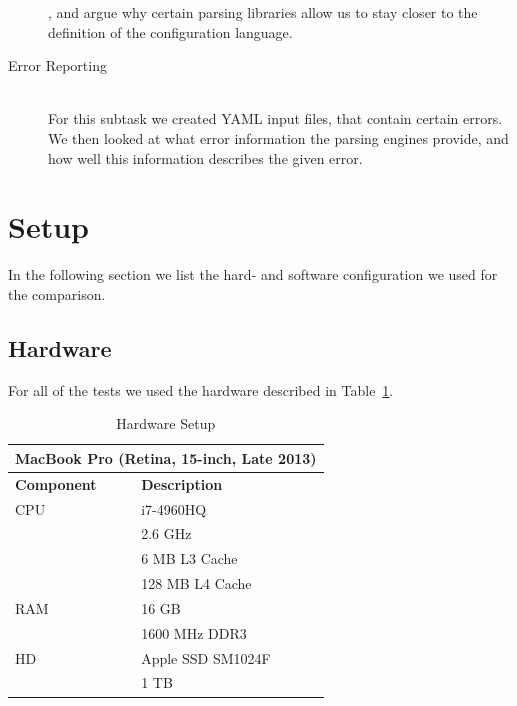 \begin{description}
  \closeness*

  , and argue why certain parsing libraries allow us to stay closer to the definition of the configuration language.

  \item[Error Reporting]~\\[0.1cm]
  For this subtask we created YAML input files, that contain certain errors. We then looked at what error information the parsing engines provide, and how well this information describes the given error.

\end{description}

\section{Setup}

In the following section we list the hard- and software configuration we used for the comparison.

\subsection{Hardware}

For all of the tests we used the hardware described in Table~\ref{table:benchmark_hardware}.

\begin{table}[H]
  \caption{Hardware Setup}
  \label{table:benchmark_hardware}
  \centering
  \begin{tabular}{ll}
\toprule
\multicolumn{2}{c}{MacBook Pro (Retina, 15-inch, Late 2013)}\\
\midrule
\textbf{Component} & \textbf{Description}\\
\midrule
               CPU &            i7-4960HQ\\
                   &              2.6 GHz\\
                   &        6 MB L3 Cache\\
                   &      128 MB L4 Cache\\
               RAM &                16 GB\\
                   &        1600 MHz DDR3\\
                HD &    Apple SSD SM1024F\\
                   &                 1 TB\\
\bottomrule
  \end{tabular}
\end{table}

